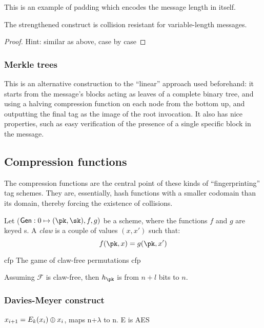 This is an example of padding which encodes the message length in itself.

\begin{theorem}
    The strengthened construct is collision resistant for variable-length messages.
\end{theorem}

\begin{proof}
    Hint: similar as above, case by case
\end{proof}

\subsubsection{Merkle trees}

This is an alternative construction to the ``linear'' approach used beforehand: it starts from the message's blocks acting as leaves of a complete binary tree, and using a halving compression function on each node from the bottom up, and outputting the final tag as the image of the root invocation. It also has nice properties, such as easy verification of the presence of a single specific block in the message.

\subsection{Compression functions}

The compression functions are the central point of these kinds of ``fingerprinting'' tag schemes. They are, essentially, hash functions with a smaller codomain than its domain, thereby forcing the existence of collisions.

Let ($\textsf{Gen} : 0 \mapsto (\pk, \sk), f, g)$ be a \pke{} scheme, where the functions $f$ and $g$ are keyed \prp{}s. A \emph{claw} is a couple of values $(x, x')$ such that:
\[
    f(\pk, x) = g(\pk, x')
\]

\begin{cryptogame}
    {cfp}
    {The game of claw-free permutations}
    {cfp}
    

\end{cryptogame}

\begin{theorem}
    Assuming $\mathcal{F}$ is claw-free, then $h_\pk$ is \crh{} from $n + l$ bits to $n$.
\end{theorem}

\subsubsection{Davies-Meyer construct}

\begin{definition}
    $x_{i + 1} = E_k(x_i) \oplus x_i$, maps n+$\lambda$ to n. E is AES
\end{definition}

